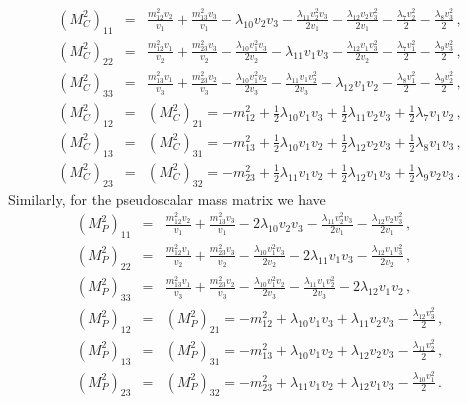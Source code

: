 \documentclass[11pt]{article}
\begin{document}
\begin{subequations}
	\begin{eqnarray}
	\label{e:Mcsqz3}
	(M_C^2)_{11} &=&   \frac{ m_{12}^2 v_2}{v_1} + \frac{ m_{13}^2 v_3}{v_1} - \lambda_{10} v_2 v_3-\frac{\lambda_{11} v_2^2 v_3}{2 v_1} -\frac{\lambda_{12} v_2 v_3^2}{2 v_1}  -\frac{\lambda_7 v_2^2}{2} -\frac{\lambda_8 v_3^2}{2} \,,\\
	(M_C^2)_{22} &=&   \frac{m_{12}^2 v_1}{v_2} + \frac{m_{23}^2 v_3}{v_2} - \frac{\lambda_{10} v_1^2 v_3}{2v_2} - \lambda_{11} v_1 v_3 - \frac{\lambda_{12} v_1 v_3^2}{2 v_2} - \frac{\lambda_7 v_1^2}{2}  - \frac{\lambda_9 v_3^2}{2} \,,\\
	(M_C^2)_{33} &=& \frac{ m_{13}^2 v_1}{v_3} + \frac{m_{23}^2 v_2}{v_3} - \frac{\lambda_{10} v_1^2 v_2}{2 v_3} - \frac{\lambda_{11} v_1 v_2^2}{2 v_3} - \lambda_{12} v_1 v_2   - \frac{\lambda_8 v_1^2}{2} - \frac{\lambda_9 v_2^2}{2} \,,\\
	(M_C^2)_{12}    &=&  	(M_C^2)_{21}   = - m_{12}^2 + \frac{1}{2}\lambda_{10}v_1 v_3 + \frac{1}{2}\lambda_{11}v_2 v_3  + \frac{1}{2}\lambda_7 v_1 v_2 \,,\\
	(M_C^2)_{13}     &=&  	(M_C^2)_{31}    =  - m_{13}^2 + \frac{1}{2} \lambda_{10} v_1 v_2+ \frac{1}{2} \lambda_{12} v_2 v_3+ \frac{1}{2} \lambda_8 v_1 v_3 \,,\\
	(M_C^2)_{23}    &=&  	(M_C^2)_{32}  = - m_{23}^2 + \frac{1}{2} \lambda_{11} v_1 v_2 + \frac{1}{2} \lambda_{12} v_1 v_3 + \frac{1}{2} \lambda_9 v_2 v_3 \,.
	\end{eqnarray}
\end{subequations}
%
Similarly, for the pseudoscalar mass matrix we have
%
\begin{subequations}
	\begin{eqnarray}
	\label{e:Mpsqz3}
	(M_P^2)_{11}    &=&  \frac{ m_{12}^2 v_2}{v_1} +\frac{ m_{13}^2 v_3}{v_1} -2 \lambda_{10} v_2 v_3 -\frac{\lambda_{11} v_2^2 v_3}{2 v_1} -\frac{\lambda_{12} v_2 v_3^2}{2 v_1} \,, \\ 
	(M_P^2)_{22}  &=& \frac{m_{12}^2 v_1}{v_2} +\frac{m_{23}^2 v_3}{v_2} -\frac{\lambda_{10} v_1^2 v_3}{2 v_2} -2 \lambda_{11} v_1 v_3 -\frac{\lambda_{12} v_1 v_3^2}{2 v_2} \,,\\
	(M_P^2)_{33}   &=&  \frac{m_{13}^2 v_1}{v_3} +\frac{ m_{23}^2 v_2}{v_3} -\frac{\lambda_{10} v_1^2 v_2}{2 v_3} -\frac{\lambda_{11} v_1 v_2^2}{2 v_3} -2 \lambda_{12} v_1 v_2  \,,\\
	(M_P^2)_{12}    &=&   (M_P^2)_{21}   = -m_{12}^2 + \lambda_{10} v_1 v_3 + \lambda_{11} v_2 v_3 - \frac{\lambda_{12} v_3^2 }{2} \,,\\
	(M_P^2)_{13}    &=&   (M_P^2)_{31}   = -m_{13}^2 + \lambda_{10} v_1 v_2 + \lambda_{12} v_2 v_3 - \frac{ \lambda_{11} v_2^2}{2} \,,\\      
	(M_P^2)_{23}   &=&   (M_P^2)_{32}  =  -m_{23}^2 + \lambda_{11} v_1 v_2 + \lambda_{12} v_1 v_3 - \frac{ \lambda_{10} v_1^2}{2} \,.        
	\end{eqnarray}
\end{subequations}
\end{document}
